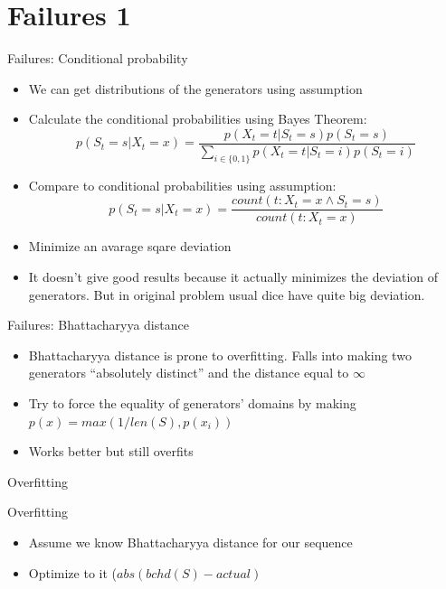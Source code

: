 \documentclass[hyperref=unicode,graphics=pdflatex,13pt]{beamer}
\begin{document}
\section{Failures 1}
\begin{frame}{Failures: Conditional probability}
 \begin{itemize}
  \item We can get distributions of the generators using assumption
  \item Calculate the conditional probabilities using Bayes Theorem:
  $$p(S_t = s | X_t = x) = \frac{p(X_t = t | S_t = s) p(S_t = s)}{\sum_{i \in \{0, 1\}}p(X_t = t | S_t = i) p(S_t = i)}$$
  \item Compare to conditional probabilities using assumption:
  $$p(S_t = s | X_t = x) = \frac{count(t: X_t = x \wedge S_t = s)}{count(t: X_t = x)}$$
  \item Minimize an avarage sqare deviation
  \item It doesn't give good results because it actually minimizes the deviation of generators. But in original problem usual dice have quite big deviation.
 \end{itemize}

\end{frame}

\begin{frame}{Failures: Bhattacharyya distance}
\begin{itemize}
 \item Bhattacharyya distance is prone to overfitting. Falls into making two generators ``absolutely distinct'' and the distance equal to $\infty$
 \item Try to force the equality of generators' domains by making $p(x) = max(1/len(S), p(x_i))$
 \item Works better but still overfits
\end{itemize}
\end{frame}

\begin{frame}{Overfitting}
\end{frame}

\begin{frame}{Overfitting}
 \begin{itemize}
  \item Assume we know Bhattacharyya distance for our sequence
  \item Optimize to it ($ abs(bchd(S)-actual) $
 \end{itemize}

\end{frame}
\end{document}
